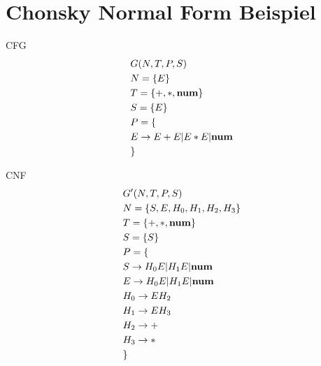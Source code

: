 \documentclass[t]{beamer}
\begin{document}
    \section{Chonsky Normal Form Beispiel}\label{sec:chonsky-normal-form-beispiel}
    \begin{frame}
        \centering
        \vspace{-1em}
        \begin{minipage}[c]{0.4\textwidth}
            \begin{block}{CFG}
                \vspace{-1em}
                \begin{align*}
                    & G(N,T,P,S) \\
                    & N= \{E\} \\
                    & T= \{+, *, \bold{num}\} \\
                    & S= \{E\}  \\
                    & P = \{ \\
                    & E \rightarrow E + E | E * E | \bold{num} \\
                    & \}
                \end{align*}
            \end{block}
        \end{minipage}%
        \quad%
        \quad%
        \begin{minipage}[c]{0.4\textwidth}%
            \begin{block}{CNF}
                \vspace{-1em}
                \begin{align*}
                    & G'(N,T,P,S) \\
                    & N= \{S, E, H_0, H_1, H_2, H_3\} \\
                    & T= \{+, *, \bold{num}\} \\
                    & S= \{S\}  \\
                    & P = \{ \\
                    & S \rightarrow H_0 E | H_1 E | \bold{num} \\
                    & E \rightarrow H_0 E | H_1 E | \bold{num} \\
                    & H_0 \rightarrow E H_2 \\
                    & H_1 \rightarrow E H_3 \\
                    & H_2 \rightarrow + \\
                    & H_3 \rightarrow * \\
                    & \}
                \end{align*}
            \end{block}
        \end{minipage}
    \end{frame}
\end{document}
